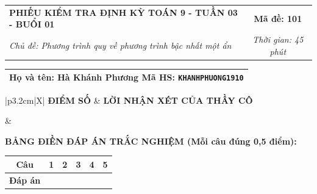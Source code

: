 \documentclass[12pt,a4paper]{article}
\begin{document}
\newpage



\noindent
\begin{tabularx}{\linewidth}{|X|c|}
\hline
\textbf{PHIẾU KIỂM TRA ĐỊNH KỲ TOÁN 9 - TUẦN 03 - BUỔI 01} & \textbf{Mã đề: 101} \\
\textit{Chủ đề: Phương trình quy về phương trình bậc nhất một ẩn} & \textit{Thời gian: 45 phút} \\
\hline
\end{tabularx}

\vspace{1mm}

\noindent
\begin{tabularx}{\linewidth}{|X|}
\hline
\rule[-2mm]{0pt}{7.5mm}\textbf{Họ và tên:} \textbf{\large Hà Khánh Phương} \hfill \textbf{Mã HS:} \texttt{KHANHPHUONG1910} \quad \\
\hline
\end{tabularx}

\vspace{1mm}

\noindent
\begin{tabularx}{\linewidth}{|p{3.2cm}|X|}
\hline
\centering\textbf{ĐIỂM SỐ} & \centering\textbf{LỜI NHẬN XÉT CỦA THẦY CÔ} \tabularnewline
\hline
\rule{0pt}{1.3cm} & \tabularnewline
\hline
\end{tabularx}

\vspace{1.2mm}

\noindent\textbf{BẢNG ĐIỀN ĐÁP ÁN TRẮC NGHIỆM (Mỗi câu đúng 0,5 điểm):}
\vspace{0.8mm}

\noindent
\renewcommand{\arraystretch}{1.35}
\begin{tabularx}{\linewidth}{|c|*{5}{>{\centering\arraybackslash}X|}}
\hline
\textbf{Câu} & \textbf{1} & \textbf{2} & \textbf{3} & \textbf{4} & \textbf{5} \\
\hline
\textbf{Đáp án} & & & & & \\
\hline
\end{tabularx}
\renewcommand{\arraystretch}{1.0}

\vspace{1.5mm}
\end{document}
